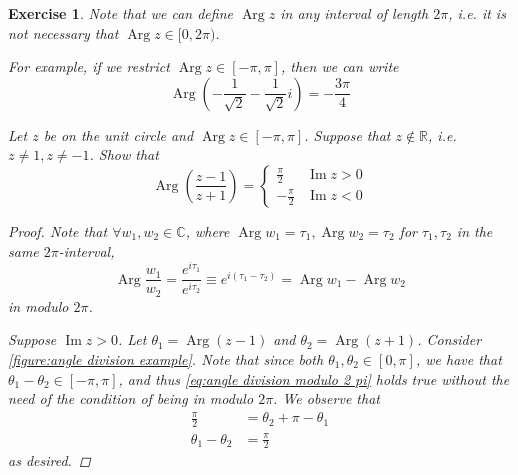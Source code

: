 \documentclass[11pt, oneside]{book}
\theoremstyle{break}
\newtheorem*{proof}{Proof}
\newtheorem{ex}{Exercise}[section]
\DeclareMathOperator{\im}{Im}
\DeclareMathOperator{\caparg}{Arg}
\newcommand{\Arg}[1]{\caparg #1}
\begin{document}
\begin{ex}
	Note that we can define $\Arg{z}$ in any interval of length $2 \pi$, i.e. it is not necessary that $\Arg{z} \in [0, 2\pi)$.

	For example, if we restrict $\Arg{z} \in [-\pi, \pi]$, then we can write
	\begin{equation*}
		\Arg{\left(-\frac{1}{\sqrt{2}} - \frac{1}{\sqrt{2}} i \right)} = - \frac{3\pi}{4}
	\end{equation*}

	Let $z$ be on the unit circle and $\Arg{z} \in [-\pi, \pi]$. Suppose that $z \notin \mathbb{R}$, i.e. $z \neq 1, z \neq -1$. Show that
	\begin{equation*}
		\Arg{\left( \frac{z-1}{z+1} \right)} = \begin{cases}
			\frac{\pi}{2} & \im{z} > 0 \\
			-\frac{\pi}{2} & \im{z} < 0
		\end{cases}
	\end{equation*}

	\begin{proof}
		Note that $\forall w_1, w_2 \in \mathbb{C}$, where $\Arg{w_1} = \tau_1, \Arg{w_2} = \tau_2$ for $\tau_1, \tau_2$ in the same $2\pi$-interval,
		\begin{equation}\label{eq:angle division modulo 2 pi}
			\Arg{\frac{w_1}{w_2} = \frac{e^{i\tau_1}}{e^{i\tau_2}} \equiv e^{i (\tau_1 - \tau_2)} = \Arg{w_1} - \Arg{w_2}}
		\end{equation}
		in modulo $2\pi$.

		Suppose $\im{z} > 0$. Let $\theta_1 = \Arg{(z - 1)}$ and $\theta_2 = \Arg{(z + 1)}$. Consider \cref{figure:angle division example}. Note that since both $\theta_1, \theta_2 \in [0, \pi]$, we have that $\theta_1 - \theta_2 \in [-\pi, \pi]$, and thus \cref{eq:angle division modulo 2 pi} holds true without the need of the condition of being in modulo $2 \pi$. We observe that
		\begin{align*}
			\frac{\pi}{2} &= \theta_2 + \pi - \theta_1 \\
			\theta_1 - \theta_2 &= \frac{\pi}{2}
		\end{align*}
		as desired.


\end{proof}
\end{ex}
\end{document}
